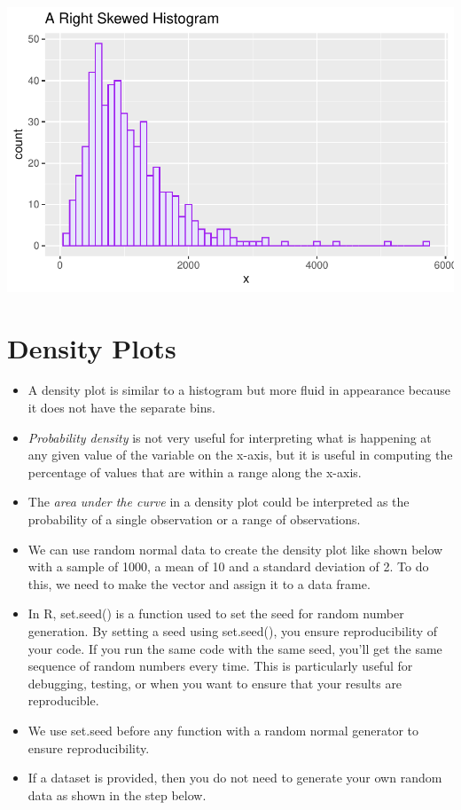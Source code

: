 \documentclass[
  letterpaper,
  DIV=11,
  numbers=noendperiod]{scrreprt}
\begin{document}
\includegraphics{dataviz_files/figure-pdf/unnamed-chunk-19-1.pdf}

\section{Density Plots}\label{density-plots}

\begin{itemize}
\item
  A density plot is similar to a histogram but more fluid in appearance
  because it does not have the separate bins.\\
\item
  \emph{Probability density} is not very useful for interpreting what is
  happening at any given value of the variable on the x-axis, but it is
  useful in computing the percentage of values that are within a range
  along the x-axis.
\item
  The \emph{area under the curve} in a density plot could be interpreted
  as the probability of a single observation or a range of observations.
\item
  We can use random normal data to create the density plot like shown
  below with a sample of 1000, a mean of 10 and a standard deviation of
  2. To do this, we need to make the vector and assign it to a data
  frame.
\item
  In R, set.seed() is a function used to set the seed for random number
  generation. By setting a seed using set.seed(), you ensure
  reproducibility of your code. If you run the same code with the same
  seed, you'll get the same sequence of random numbers every time. This
  is particularly useful for debugging, testing, or when you want to
  ensure that your results are reproducible.
\item
  We use set.seed before any function with a random normal generator to
  ensure reproducibility.
\item
  If a dataset is provided, then you do not need to generate your own
  random data as shown in the step below.
\end{itemize}
\end{document}
